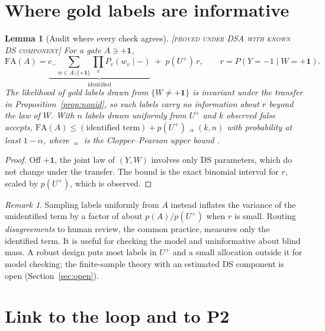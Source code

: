 \documentclass[11pt]{article}
\newtheorem{lemma}{Lemma}
\theoremstyle{definition}
\theoremstyle{remark}
\newtheorem*{remark}{Remark}
\newcommand{\status}[1]{\hfill{\normalfont\small\textsc{[#1]}}}
\newcommand{\one}{\mathbf{1}}
\newcommand{\Up}{U^{+}}
\DeclareMathOperator{\CPup}{\overline{r}}
\begin{document}
\section{Where gold labels are informative}

\begin{lemma}[Audit where every check agrees]\label{lem:audit}\status{proved under DSA with known DS component}
For a gate $A\ni+\one$,
\[
\mathrm{FA}(A)=\underbrace{c_-\!\!\sum_{w\in A\setminus\{+\one\}}\prod_v P_v(w_v\mid -)}_{\text{identified}}\;+\;p(\Up)\,r,\qquad r=P(Y=-1\mid W=+\one).
\]
The likelihood of gold labels drawn from $\{W\neq+\one\}$ is invariant under the transfer in Proposition~\ref{prop:nonid}, so such labels carry no information about $r$ beyond the law of $W$. With $n$ labels drawn uniformly from $\Up$ and $k$ observed false accepts,
$\mathrm{FA}(A)\le(\text{identified term})+p(\Up)\,\CPup_\alpha(k,n)$ with probability at least $1-\alpha$, where $\CPup_\alpha$ is the Clopper--Pearson upper bound \cite{clopper1934}.
\end{lemma}
\begin{proof}
Off $+\one$, the joint law of $(Y,W)$ involves only DS parameters, which do not change under the transfer. The bound is the exact binomial interval for $r$, scaled by $p(\Up)$, which is observed.
\end{proof}

\begin{remark}
Sampling labels uniformly from $A$ instead inflates the variance of the unidentified term by a factor of about $p(A)/p(\Up)$ when $r$ is small. Routing \emph{disagreements} to human review, the common practice, measures only the identified term. It is useful for checking the model and uninformative about blind mass. A robust design puts most labels in $\Up$ and a small allocation outside it for model checking; the finite-sample theory with an estimated DS component is open (Section~\ref{sec:open}).
\end{remark}

\section{Link to the loop and to P2}\label{sec:dynamics}
\end{document}
